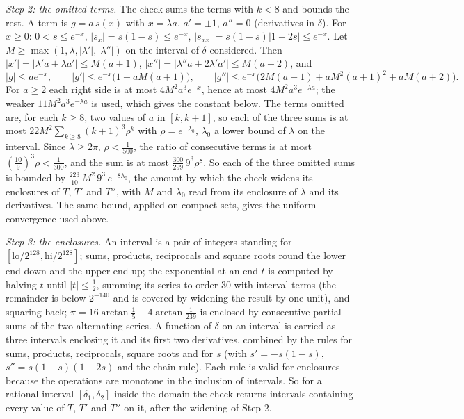 \emph{Step 2: the omitted terms.} The check sums the terms with $k < 8$ and bounds the rest. A term is $g = a\,s(x)$ with $x = \lambda a$, $a' = \pm 1$, $a'' = 0$ (derivatives in $\delta$). For $x \ge 0$: $0 < s \le e^{-x}$, $|s_{x}| = s(1 - s) \le e^{-x}$, $|s_{xx}| = s(1 - s)|1 - 2s| \le e^{-x}$. Let $M \ge \max(1, \lambda, |\lambda'|, |\lambda''|)$ on the interval of $\delta$ considered. Then $|x'| = |\lambda'a + \lambda a'| \le M(a + 1)$, $|x''| = |\lambda''a + 2\lambda'a'| \le M(a + 2)$, and
\[
|g| \le ae^{-x}, \qquad |g'| \le e^{-x}\bigl(1 + aM(a + 1)\bigr), \qquad |g''| \le e^{-x}\bigl(2M(a + 1) + aM^{2}(a + 1)^{2} + aM(a + 2)\bigr).
\]
For $a \ge 2$ each right side is at most $4M^{2}a^{3}e^{-x}$, hence at most $4M^{2}a^{3}e^{-\lambda a}$; the weaker $11M^{2}a^{3}e^{-\lambda a}$ is used, which gives the constant below. The terms omitted are, for each $k \ge 8$, two values of $a$ in $[k, k + 1]$, so each of the three sums is at most $22M^{2}\sum_{k \ge 8}(k + 1)^{3}\rho^{k}$ with $\rho = e^{-\lambda_{0}}$, $\lambda_{0}$ a lower bound of $\lambda$ on the interval. Since $\lambda \ge 2\pi$, $\rho < \tfrac{1}{500}$, the ratio of consecutive terms is at most $(\tfrac{10}{9})^{3}\rho < \tfrac{1}{300}$, and the sum is at most $\tfrac{300}{299}\,9^{3}\rho^{8}$. So each of the three omitted sums is bounded by $\tfrac{223}{10}\,M^{2}\,9^{3}\,e^{-8\lambda_{0}}$, the amount by which the check widens its enclosures of $T$, $T'$ and $T''$, with $M$ and $\lambda_{0}$ read from its enclosure of $\lambda$ and its derivatives. The same bound, applied on compact sets, gives the uniform convergence used above.

\emph{Step 3: the enclosures.} An interval is a pair of integers standing for $[\mathrm{lo}/2^{128}, \mathrm{hi}/2^{128}]$; sums, products, reciprocals and square roots round the lower end down and the upper end up; the exponential at an end $t$ is computed by halving $t$ until $|t| \le \tfrac12$, summing its series to order $30$ with interval terms (the remainder is below $2^{-140}$ and is covered by widening the result by one unit), and squaring back; $\pi = 16\arctan\tfrac15 - 4\arctan\tfrac{1}{239}$ is enclosed by consecutive partial sums of the two alternating series. A function of $\delta$ on an interval is carried as three intervals enclosing it and its first two derivatives, combined by the rules for sums, products, reciprocals, square roots and for $s$ (with $s' = -s(1 - s)$, $s'' = s(1 - s)(1 - 2s)$ and the chain rule). Each rule is valid for enclosures because the operations are monotone in the inclusion of intervals. So for a rational interval $[\delta_{1}, \delta_{2}]$ inside the domain the check returns intervals containing every value of $T$, $T'$ and $T''$ on it, after the widening of Step 2.

